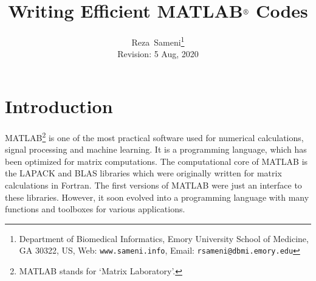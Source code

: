 \documentclass[10pt,a4paper]{article}
\begin{document}
\title{Writing Efficient MATLAB$^{\text{\small{\textregistered}}}$ Codes}
\author{Reza~Sameni\footnote{Department of Biomedical Informatics, Emory University School of Medicine, GA 30322, US, Web: \texttt{www.sameni.info}, Email: \texttt{rsameni@dbmi.emory.edu}}\\
Revision: 5 Aug, 2020}
\date{}
\maketitle
\thispagestyle{empty}
\section{Introduction}
\label{sec:introduction}
MATLAB\footnote{MATLAB stands for `Matrix Laboratory'.} is one of the most practical software used for numerical calculations, signal processing and machine learning. It is a programming language, which has been optimized for matrix computations. The computational core of MATLAB is the LAPACK and BLAS libraries which were originally written for matrix calculations in Fortran. The first versions of MATLAB were just an interface to these libraries. However, it soon evolved into a programming language with many functions and toolboxes for various applications.
\end{document}
